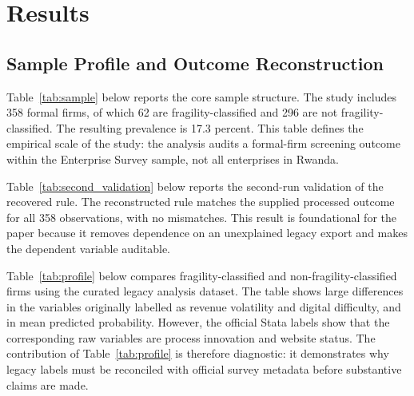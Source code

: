 \section{Results}

\subsection{Sample Profile and Outcome Reconstruction}

Table~\ref{tab:sample} below reports the core sample structure. The study includes 358 formal firms, of which 62 are fragility-classified and 296 are not fragility-classified. The resulting prevalence is 17.3 percent. This table defines the empirical scale of the study: the analysis audits a formal-firm screening outcome within the Enterprise Survey sample, not all enterprises in Rwanda.

\begin{table}[H]
\centering
\caption{Sample Summary}
\label{tab:sample}

\end{table}

Table~\ref{tab:second_validation} below reports the second-run validation of the recovered rule. The reconstructed rule matches the supplied processed outcome for all 358 observations, with no mismatches. This result is foundational for the paper because it removes dependence on an unexplained legacy export and makes the dependent variable auditable.

\begin{table}[H]
\centering
\caption{Second-Run Fragility Rule Validation}
\label{tab:second_validation}

\end{table}

Table~\ref{tab:profile} below compares fragility-classified and non-fragility-classified firms using the curated legacy analysis dataset. The table shows large differences in the variables originally labelled as revenue volatility and digital difficulty, and in mean predicted probability. However, the official Stata labels show that the corresponding raw variables are process innovation and website status. The contribution of Table~\ref{tab:profile} is therefore diagnostic: it demonstrates why legacy labels must be reconciled with official survey metadata before substantive claims are made.

\begin{table}[H]
\centering
\caption{Descriptive Profile by Fragility Classification}
\label{tab:profile}
\resizebox{\textwidth}{!}{}
\end{table}

